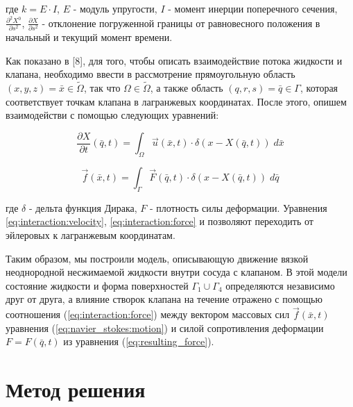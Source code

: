 где \(k = E \cdot I\), \(E\) - модуль упругости, \(I\) - момент инерции
поперечного сечения, \(\frac{\partial^2 X^0}{\partial s^2}\),
\(\frac{\partial X}{\partial s^2}\) - отклонение погруженной границы от
равновесного положения в начальный и текущий момент времени.

Как показано в {[}8{]}, для того, чтобы описать взаимодействие потока
жидкости и клапана, необходимо ввести в рассмотрение прямоугольную
область \((x, y, z) = \bar{x} \in \tilde{\Omega}\), так что
\(\Omega \in \tilde{\Omega}\), а также область
\((q, r, s) = \bar{q} \in \Gamma\), которая соответствует точкам клапана
в лагранжевых координатах. После этого, опишем взаимодействи с помощью
следующих уравнений:

\begin{equation}\frac{\partial X}{\partial t}(\bar{q}, t) = \int_{\Omega} \vec{u}(\bar{x}, t) \cdot \delta (x - X(\bar{q}, t))\; d\bar{x}\label{eq:interaction:velocity}\end{equation}

\begin{equation}\vec{f}(\bar{x}, t) = \int_{\Gamma} \vec{F}(\bar{q}, t) \cdot \delta (x - X(\bar{q}, t))\; d\bar{q}\label{eq:interaction:force}\end{equation}

где \(\delta\) - дельта функция Дирака, \(F\) - плотность силы
деформации. Уравнения \ref{eq:interaction:velocity},
\ref{eq:interaction:force} и позволяют переходить от эйлеровых к
лагранжевым координатам.

Таким образом, мы построили модель, описывающую движение вязкой
неоднородной несжимаемой жидкости внутри сосуда с клапаном. В этой
модели состояние жидкости и форма поверхностей
\(\Gamma_1 \cup \Gamma_4\) определяются независимо друг от друга, а
влияние створок клапана на течение отражено с помощью соотношения
(\ref{eq:interaction:force}) между вектором массовых сил
\(\vec{f}(\bar{x}, t)\) уравнения (\ref{eq:navier_stokes:motion}) и
силой сопротивления деформации \(F=F(\bar{q}, t)\) из уравнения
(\ref{eq:resulting_force}).

\section{Метод
решения}\label{ux43cux435ux442ux43eux434-ux440ux435ux448ux435ux43dux438ux44f}

